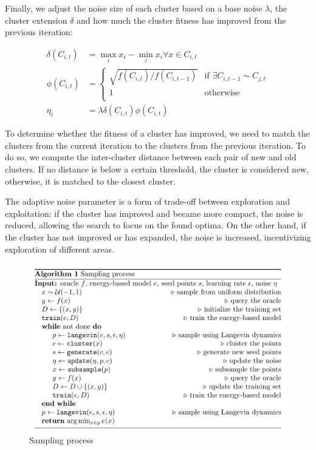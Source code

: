 Finally, we adjust the noise size of each cluster based on a base noise $\lambda$, the cluster extension $\delta$ and how much the cluster fitness has improved from the previous iteration:

\begin{align*}
    \delta(C_{i,t}) & = \max_{i} x_i - \min_{i} x_i \forall x \in C_{i,t}                                                                        \\
    \phi(C_{i,t})   & = \begin{cases}
                            \sqrt{f(C_{i,t}) / f(C_{i, t-1}) } & \text{if } \exists C_{i, t-1} \sim C_{j,t} \\
                            1                                  & \text{otherwise}                           \\
                        \end{cases} \\
    \eta_i          & = \lambda \delta(C_{i,t}) \phi(C_{i,t})
\end{align*}

To determine whether the fitness of a cluster has improved, we need to match the clusters from the current iteration to the clusters from the previous iteration. To do so, we compute the inter-cluster distance between each pair of new and old clusters. If no distance is below a certain threshold, the cluster is considered new, otherwise, it is matched to the closest cluster.

The adaptive noise parameter is a form of trade-off between exploration and exploitation: if the cluster has improved and became more compact, the noise is reduced, allowing the search to focus on the found optima. On the other hand, if the cluster has not improved or has expanded, the noise is increased, incentivizing exploration of different areas.

\begin{figure}
    \centering
    \includegraphics[width=\columnwidth]{img/sampling.png}
    \caption{Sampling process}
    \label{alg:sampling}
\end{figure}

